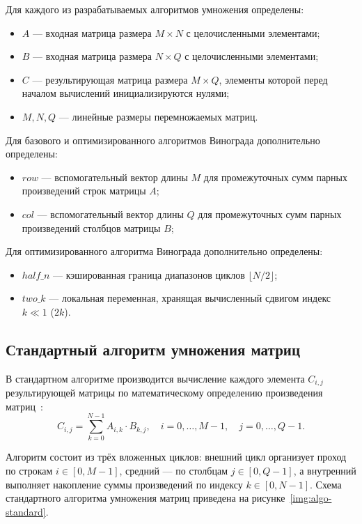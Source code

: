 Для каждого из разрабатываемых алгоритмов умножения определены:
\begin{itemize}
    \item $A$ --- входная матрица размера $M \times N$ с целочисленными элементами;
    \item $B$ --- входная матрица размера $N \times Q$ с целочисленными элементами;
    \item $C$ --- результирующая матрица размера $M \times Q$, элементы которой перед началом вычислений инициализируются нулями;
    \item $M, N, Q$ --- линейные размеры перемножаемых матриц.
\end{itemize}

Для базового и оптимизированного алгоритмов Винограда дополнительно определены:
\begin{itemize}
    \item $row$ --- вспомогательный вектор длины $M$ для промежуточных сумм парных произведений строк матрицы $A$;
    \item $col$ --- вспомогательный вектор длины $Q$ для промежуточных сумм парных произведений столбцов матрицы $B$;
\end{itemize}

Для оптимизированного алгоритма Винограда дополнительно определены:
\begin{itemize}
    \item $half\_n$ --- кэшированная граница диапазонов циклов $\lfloor N / 2 \rfloor$;
    \item $two\_k$ --- локальная переменная, хранящая вычисленный сдвигом индекс $k \ll 1$ ($2k$).
\end{itemize}

\subsection{Стандартный алгоритм умножения матриц}

В стандартном алгоритме производится вычисление каждого элемента $C_{i,j}$ результирующей матрицы по математическому определению произведения матриц~\cite{cormen}:
\begin{equation}
    C_{i,j} = \sum_{k=0}^{N-1} A_{i,k} \cdot B_{k,j}, \quad i = 0, \ldots, M-1, \quad j = 0, \ldots, Q-1.
\end{equation}

Алгоритм состоит из трёх вложенных циклов: внешний цикл организует проход по строкам $i \in [0, M - 1]$, средний --- по столбцам $j \in [0, Q - 1]$, а внутренний выполняет накопление суммы произведений по индексу $k \in [0, N - 1]$. Схема стандартного алгоритма умножения матриц приведена на рисунке~\ref{img:algo-standard}.

